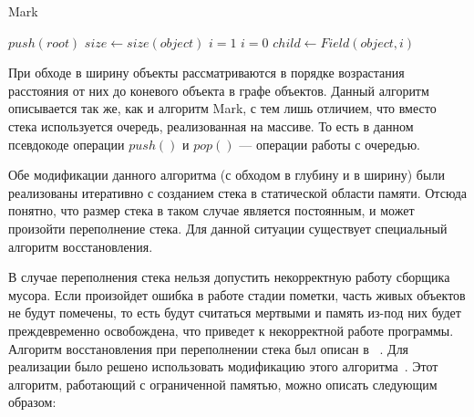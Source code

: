\begin{algorithm}[p]
\caption{Mark}
\label{BFS}
\begin{algorithmic}[1]
                \EndIf
                \State $push(root)$
                    \State $size \leftarrow size(object)$
                        \State $i = 1$
                    \Else
                        \State $i = 0$
                    \EndIf
                        \State $child \leftarrow Field(object, i)$
                            \EndIf
                        \EndIf
                    \EndFor
                \EndWhile
            \EndIf
        \EndIf
    \EndFor
\end{algorithmic}
\end{algorithm}


При обходе в ширину объекты рассматриваются в порядке возрастания расстояния от них до коневого объекта в графе объектов. Данный алгоритм описывается
так же, как и алгоритм Mark, с тем лишь отличием, что вместо стека используется очередь, реализованная на массиве. То есть в данном псевдокоде операции 
$push()$ и $pop()$ --- операции работы с очередью.

Обе модификации данного алгоритма (с обходом в глубину и в ширину) были реализованы итеративно с созданием стека в статической области памяти. 
Отсюда понятно, что размер стека в таком случае является постоянным, и может произойти переполнение стека. Для данной ситуации существует 
специальный алгоритм восстановления.

В случае переполнения стека нельзя допустить некорректную работу сборщика мусора. Если произойдет ошибка в работе стадии пометки, часть живых 
объектов не будут помечены, то есть будут считаться мертвыми и память из-под них будет преждевременно освобождена, что приведет к 
некорректной работе программы. Алгоритм восстановления при переполнении стека был описан в ~\cite{knuth}. Для реализации было решено использовать модификацию 
этого алгоритма~\cite{pliss}. Этот алгоритм, работающий с ограниченной памятью, можно описать следующим образом:

